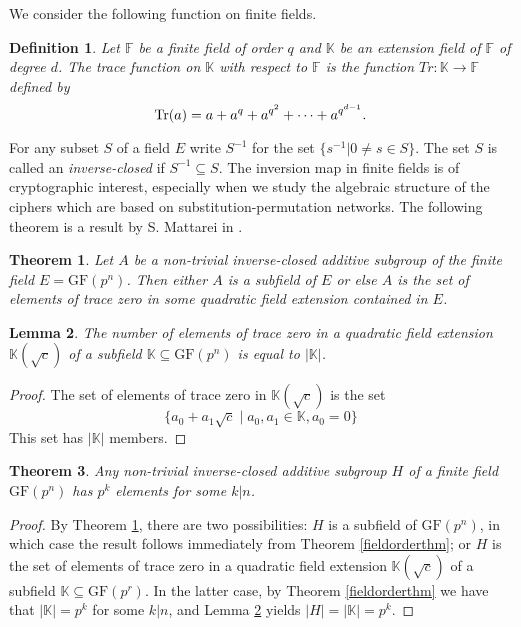 \documentclass[11pt]{amsart}
\newcommand{\field}{{\mathbb F}}
\newcommand{\GF}{\mathrm{GF}}
\newtheorem{definition}{{\bf Definition}}
\newtheorem{theorem}{{\bf Theorem }}
\newtheorem{lemma}[theorem]{{\bf Lemma }}
\begin{document}
We consider the following function on finite fields.
\begin{definition}
Let $\field$ be a finite field of order $q$ and $\mathbb K$ be an extension field of $\field$ of degree $d$. The \emph{trace} function on $\mathbb K$ with respect to $\field$ is the function $Tr:\mathbb K\rightarrow \mathbb F$ defined by  
\[ 
\textup{Tr}(a) = a + a^q + a^{q^2} + \cdots + a^{q^{d-1}}.
\]
\end{definition}
For any subset $S$ of a field $E$ write $S^{-1}$ for the set $\{s^{-1}\vert 0\neq s\in S\}$. The set $S$ is called  an \emph{inverse-closed} if $S^{-1}\subseteq S$. The inversion map in finite fields is of cryptographic interest, especially when we study the algebraic structure of the ciphers which are based on substitution-permutation networks. 
The following theorem is a result by S. Mattarei  in \cite{Mattarei}.
\begin{theorem} \label{mattareithm}
Let $A$ be a non-trivial inverse-closed additive subgroup of the finite field $E=\GF(p^n)$. Then either $A$ is a subfield of $E$ or else $A$ is the set of elements of trace zero in some quadratic field extension contained in $E$.
\end{theorem}

\begin{lemma}\label{qfelemma}
The number of elements of trace zero in a quadratic field extension $\mathbb K(\sqrt{c})$ of a subfield $\mathbb K \subseteq \GF(p^n)$ is equal to $\vert \mathbb {K} \vert$.
\end{lemma}

\begin{proof}
The set of elements of trace zero in $\mathbb K(\sqrt{c})$ is the set 
\[
\{a_0+a_1\sqrt{c} \; \vert \; a_0,a_1 \in \mathbb K, a_0=0 \}
\]
This set has $\vert {\mathbb K} \vert$ members. 
\end{proof}
\begin{theorem}\label{invclosedaddsubgpthm}
Any non-trivial inverse-closed additive subgroup $H$ of a finite field $\GF(p^n)$ has $p^k$ elements for some $k \vert n$.
\end{theorem}
\begin{proof}
By Theorem \ref{mattareithm}, there are two possibilities: $H$ is a subfield of $\GF(p^n)$, in which case the result follows immediately from Theorem \ref{fieldorderthm}; or $H$ is the set of elements of trace zero in a quadratic field extension $\mathbb K(\sqrt{c})$ of a subfield $\mathbb K \subseteq \GF(p^r)$.  In the latter case, by Theorem \ref{fieldorderthm} we have that $\vert \mathbb K \vert = p^k$ for some $k \vert n$, and Lemma \ref{qfelemma} yields $\vert H \vert = \vert \mathbb K \vert = p^k$.
\end{proof}
\end{document}

